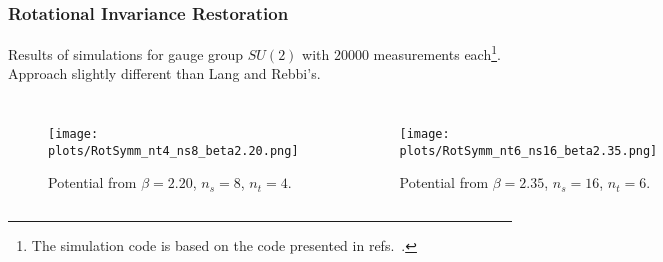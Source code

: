 \documentclass{beamer}
\begin{document}
\begin{frame}
  \frametitle{Rotational Invariance Restoration}
  Results of simulations for gauge group $\mathit{SU}(2)$ with $20000$ measurements each\footnote{The simulation code is based on the code presented in refs.~.}.
  Approach slightly different than Lang and Rebbi's.
  \vspace{-0.5\baselineskip}
  \begin{columns}
    \begin{figure}
      \texttt{[image: plots/RotSymm\_nt4\_ns8\_beta2.20.png]}
      \caption{Potential from $\beta=2.20$, $n_s=8$, $n_t=4$.}
    \end{figure}
    \begin{figure}
      \texttt{[image: plots/RotSymm\_nt6\_ns16\_beta2.35.png]}
      \caption{Potential from $\beta=2.35$, $n_s=16$, $n_t=6$.}
    \end{figure}
  \end{columns}
\end{frame}
\end{document}
